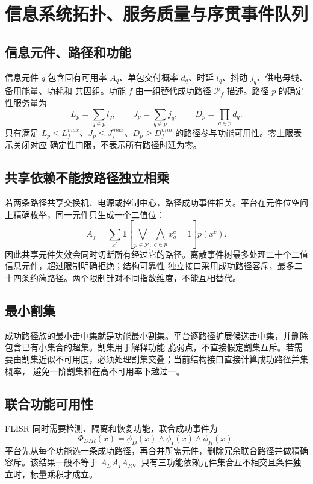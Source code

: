 \section{信息系统拓扑、服务质量与序贯事件队列}\label{sec:rel-cyber-chronology}

\subsection{信息元件、路径和功能}
信息元件 $q$ 包含固有可用率 $A_q$、单包交付概率 $d_q$、时延 $l_q$、抖动 $j_q$、供电母线、备用能量、功耗和
共因组。功能 $f$ 由一组替代成功路径 $\mathcal P_f$ 描述。路径 $p$ 的确定性服务量为
\begin{equation}
 L_p=\sum_{q\in p}l_q,\qquad J_p=\sum_{q\in p}j_q,\qquad D_p=\prod_{q\in p}d_q.
\end{equation}
只有满足 $L_p\le L_f^{max}$、$J_p\le J_f^{max}$、$D_p\ge D_f^{min}$ 的路径参与功能可用性。零上限表示关闭对应
确定性门限，不表示所有路径时延为零。

\subsection{共享依赖不能按路径独立相乘}
若两条路径共享交换机、电源或控制中心，路径成功事件相关。平台在元件位空间上精确枚举，同一元件只生成一个二值位：
\begin{equation}
 A_f=\sum_{x^c}\mathbf1\!\left[\bigvee_{p\in\mathcal P_f}
 \bigwedge_{q\in p}x_q^c=1\right]p(x^c).
\end{equation}
因此共享元件失效会同时切断所有经过它的路径。离散事件树最多处理二十个二值信息元件，超过限制明确拒绝；结构可靠性
独立接口采用成功路径容斥，最多二十四条约简路径。两个限制针对不同指数维度，不能互相替代。

\subsection{最小割集}
成功路径族的最小击中集就是功能最小割集。平台逐路径扩展候选击中集，并删除包含已有小集合的超集。割集用于解释功能
脆弱点，不直接假定割集互斥。若需要由割集近似不可用度，必须处理割集交叠；当前结构接口直接计算成功路径并集概率，
避免一阶割集和在高不可用率下越过一。

\subsection{联合功能可用性}
FLISR 同时需要检测、隔离和恢复功能，联合成功事件为
\begin{equation}
 \Phi_{DIR}(x)=\phi_D(x)\land\phi_I(x)\land\phi_R(x).
\end{equation}
平台先从每个功能选一条成功路径，再合并所需元件，删除冗余联合路径并做精确容斥。该结果一般不等于
$A_DA_IA_R$。只有三功能依赖元件集合互不相交且条件独立时，标量乘积才成立。

